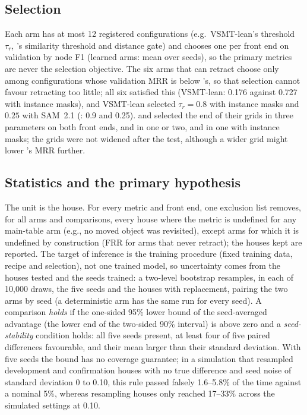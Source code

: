 \subsection{Selection}
Each arm has at most 12 registered configurations (e.g.\ VSMT-lean's threshold $\tau_r$, 's similarity threshold and distance gate) and chooses one per front end on validation by node F1 (learned arms: mean over seeds), so the primary metrics are never the selection objective.
The six arms that can retract choose only among configurations whose validation MRR is below 's, so that selection cannot favour retracting too little; all six satisfied this (VSMT-lean: 0.176 against 0.727 with instance masks), and VSMT-lean selected $\tau_r=0.8$ with instance masks and $0.25$ with SAM~2.1 (: 0.9 and 0.25).
 and  selected the end of their grids in three parameters on both front ends,  and  in one or two, and  in one with instance masks; the grids were not widened after the test, although a wider grid might lower 's MRR further.

\subsection{Statistics and the primary hypothesis}
\label{sec:stats}
The unit is the house.
For every metric and front end, one exclusion list removes, for all arms and comparisons, every house where the metric is undefined for any main-table arm (e.g., no moved object was revisited), except arms for which it is undefined by construction (FRR for arms that never retract); the houses kept are reported.
The target of inference is the training procedure (fixed training data, recipe and selection), not one trained model, so uncertainty comes from the houses tested and the seeds trained: a two-level bootstrap resamples, in each of 10,000 draws, the five seeds and the houses with replacement, pairing the two arms by seed (a deterministic arm has the same run for every seed).
A comparison \emph{holds} if the one-sided 95\% lower bound of the seed-averaged advantage (the lower end of the two-sided 90\% interval) is above zero and a \emph{seed-stability} condition holds: all five seeds present, at least four of five paired differences favourable, and their mean larger than their standard deviation.
With five seeds the bound has no coverage guarantee; in a simulation that resampled development and confirmation houses with no true difference and seed noise of standard deviation 0 to 0.10, this rule passed falsely 1.6--5.8\% of the time against a nominal 5\%, whereas resampling houses only reached 17--33\% across the simulated settings at 0.10.

